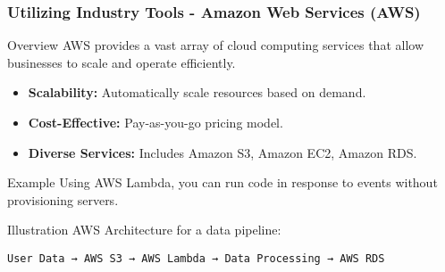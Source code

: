 \documentclass[aspectratio=169]{beamer}
\begin{document}
\begin{frame}[fragile]
    \frametitle{Utilizing Industry Tools - Amazon Web Services (AWS)}
    \begin{block}{Overview}
        AWS provides a vast array of cloud computing services that allow businesses to scale and operate efficiently.
    \end{block}
    \begin{itemize}
        \item \textbf{Scalability:} Automatically scale resources based on demand.
        \item \textbf{Cost-Effective:} Pay-as-you-go pricing model.
        \item \textbf{Diverse Services:} Includes Amazon S3, Amazon EC2, Amazon RDS.
    \end{itemize}

    \begin{block}{Example}
        Using AWS Lambda, you can run code in response to events without provisioning servers.
    \end{block}
    
    \begin{block}{Illustration}
        AWS Architecture for a data pipeline:
        \begin{lstlisting}
User Data → AWS S3 → AWS Lambda → Data Processing → AWS RDS
        \end{lstlisting}
    \end{block}
\end{frame}
\end{document}
